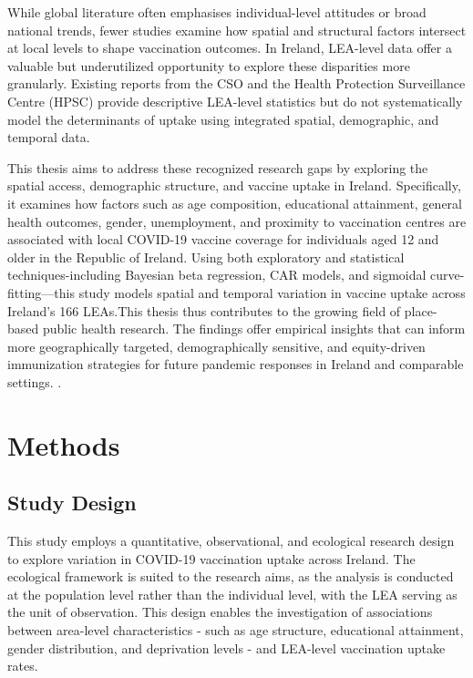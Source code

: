 \documentclass{article}
\begin{document}
While global literature often emphasises individual-level attitudes or
broad national trends, fewer studies examine how spatial and structural
factors intersect at local levels to shape vaccination outcomes. In
Ireland, LEA-level data offer a valuable but underutilized opportunity
to explore these disparities more granularly. Existing reports from the
CSO and the Health Protection Surveillance Centre (HPSC) provide
descriptive LEA-level statistics but do not systematically model the
determinants of uptake using integrated spatial, demographic, and
temporal data.

This thesis aims to address these recognized research gaps by exploring
the spatial access, demographic structure, and vaccine uptake in
Ireland. Specifically, it examines how factors such as age composition,
educational attainment, general health outcomes, gender, unemployment,
and proximity to vaccination centres are associated with local COVID-19
vaccine coverage for individuals aged 12 and older in the Republic of
Ireland. Using both exploratory and statistical techniques-including
Bayesian beta regression, CAR models, and sigmoidal curve-fitting---this
study models spatial and temporal variation in vaccine uptake across
Ireland's 166 LEAs.This thesis thus contributes to the growing field of
place-based public health research. The findings offer empirical
insights that can inform more geographically targeted, demographically
sensitive, and equity-driven immunization strategies for future pandemic
responses in Ireland and comparable settings. .

\section{Methods}\label{methods}

\subsection{Study Design}\label{study-design}

This study employs a quantitative, observational, and ecological
research design to explore variation in COVID-19 vaccination uptake
across Ireland. The ecological framework is suited to the research aims,
as the analysis is conducted at the population level rather than the
individual level, with the LEA serving as the unit of observation. This
design enables the investigation of associations between area-level
characteristics - such as age structure, educational attainment, gender
distribution, and deprivation levels - and LEA-level vaccination uptake
rates.
\end{document}
